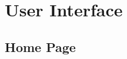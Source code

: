 \documentclass[12pt,oneside,openright,a4paper]{cpe-english-project}
\begin{document}
  \section{User Interface}
    \subsection{Home Page}
    \begin{figure}[!h]
      \centering
      \begin{minipage}{.5\textwidth}
        \centering
      \end{minipage}%
      \begin{minipage}{.3\textwidth}
        \centering
      \end{minipage}

\end{figure}
\end{document}
